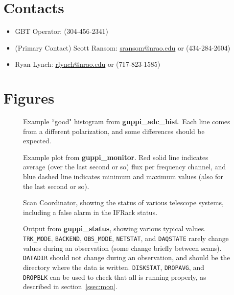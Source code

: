 \documentclass[11pt]{article}
\begin{document}

\section{Contacts}\label{sec:con}  %
\begin{itemize}
 \item GBT Operator: (304-456-2341)
 \item (Primary Contact) Scott Ransom: \href{mailto:sransom@nrao.edu}{sransom@nrao.edu} or (434-284-2604)
 \item Ryan Lynch: \href{mailto:rlynch@nrao.edu}{rlynch@nrao.edu} or (717-823-1585)
\end{itemize}
\newpage


\section{Figures}  %
\begin{figure}[h]
 \centering
  \caption{Example ``good" histogram from \textbf{guppi\_adc\_hist}.  Each line comes from a different polarization, and some differences should be expected.}
  \label{fig:gah}
\end{figure}

\vspace{2cm}
\begin{figure}[h]
 \centering
  \caption{Example plot from \textbf{guppi\_monitor}. Red solid line indicates average (over the last second or so) flux per frequency channel, and blue dashed line indicates minimum and maximum values (also for the last second or so).}
  \label{fig:mon}
\end{figure}

\begin{figure}[h]
 \centering
  \caption{Scan Coordinator, showing the status of various telescope systems, including a false alarm in the IFRack status.}
  \label{fig:sc}
\end{figure}

\begin{figure}[h]
 \centering
  \caption{Output from \textbf{guppi\_status}, showing various typical values.  \texttt{TRK\_MODE}, \texttt{BACKEND}, \texttt{OBS\_MODE}, \texttt{NETSTAT}, and \texttt{DAQSTATE} rarely change values during an observation (some change briefly between scans).  \texttt{DATADIR} should not change during an observation, and should be the directory where the data is written.  \texttt{DISKSTAT}, \texttt{DROPAVG}, and \texttt{DROPBLK} can be used to check that all is running properly, as described in section~\ref{ssec:mon}.}
  \label{fig:gps}
\end{figure}
\end{document}
